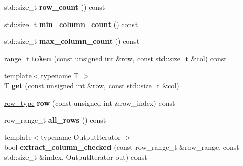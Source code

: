 \begin{DoxyCompactItemize}
\item 
\hypertarget{classstrtk_1_1token__grid_a7ce651fbc13d710bb0b3a08506a1e10c}{std\-::size\-\_\-t {\bfseries row\-\_\-count} () const }\label{classstrtk_1_1token__grid_a7ce651fbc13d710bb0b3a08506a1e10c}

\item 
\hypertarget{classstrtk_1_1token__grid_a0ad4b9b75d0b057fa729ae0994af951c}{std\-::size\-\_\-t {\bfseries min\-\_\-column\-\_\-count} () const }\label{classstrtk_1_1token__grid_a0ad4b9b75d0b057fa729ae0994af951c}

\item 
\hypertarget{classstrtk_1_1token__grid_ac2dd4c351fdec0610afc9895ab2068ae}{std\-::size\-\_\-t {\bfseries max\-\_\-column\-\_\-count} () const }\label{classstrtk_1_1token__grid_ac2dd4c351fdec0610afc9895ab2068ae}

\item 
\hypertarget{classstrtk_1_1token__grid_a532c5d00ff59b91c0b9157d2542d03ba}{range\-\_\-t {\bfseries token} (const unsigned int \&row, const std\-::size\-\_\-t \&col) const }\label{classstrtk_1_1token__grid_a532c5d00ff59b91c0b9157d2542d03ba}

\item 
\hypertarget{classstrtk_1_1token__grid_ab89a6a10be68772fdd4f432f1179a029}{{\footnotesize template$<$typename T $>$ }\\T {\bfseries get} (const unsigned int \&row, const std\-::size\-\_\-t \&col)}\label{classstrtk_1_1token__grid_ab89a6a10be68772fdd4f432f1179a029}

\item 
\hypertarget{classstrtk_1_1token__grid_a86f0273f734da4318f7ad372e9914bb3}{\hyperlink{classstrtk_1_1token__grid_1_1row__type}{row\-\_\-type} {\bfseries row} (const unsigned int \&row\-\_\-index) const }\label{classstrtk_1_1token__grid_a86f0273f734da4318f7ad372e9914bb3}

\item 
\hypertarget{classstrtk_1_1token__grid_ae6ddcb81768c86dc861fd5baae2bf776}{row\-\_\-range\-\_\-t {\bfseries all\-\_\-rows} () const }\label{classstrtk_1_1token__grid_ae6ddcb81768c86dc861fd5baae2bf776}

\item 
\hypertarget{classstrtk_1_1token__grid_a92c2dd968fcd0d4e2c2eb2fb8f29749c}{{\footnotesize template$<$typename Output\-Iterator $>$ }\\bool {\bfseries extract\-\_\-column\-\_\-checked} (const row\-\_\-range\-\_\-t \&row\-\_\-range, const std\-::size\-\_\-t \&index, Output\-Iterator out) const }\label{classstrtk_1_1token__grid_a92c2dd968fcd0d4e2c2eb2fb8f29749c}


\end{DoxyCompactItemize}
